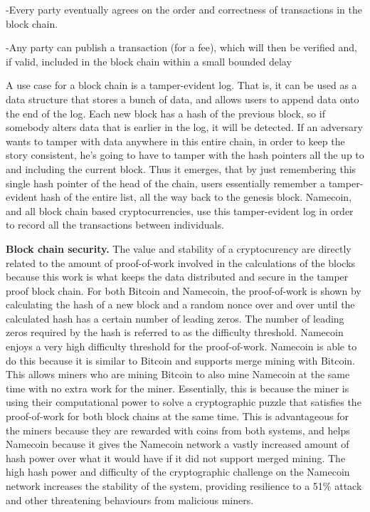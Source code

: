 -Every party eventually agrees on the order and correctness of transactions in the block chain.

-Any party can publish a transaction (for a fee), which will then be verified and, if valid, included in the block chain within a small bounded delay

A use case for a block chain is a tamper-evident log. That is, it can be used as a data structure that stores a bunch of data, and allows users to append data onto the end of the log. Each new block has a hash of the previous block, so if somebody alters data that is earlier in the log, it will be detected. If an adversary wants to tamper with data anywhere in this entire chain, in order to keep the story consistent, he's going to have to tamper with the hash pointers all the up to and including the current block. Thus it emerges, that by just remembering this single hash pointer of the head of the chain, users essentially remember a tamper-evident hash of the entire list, all the way back to the genesis block. Namecoin, and all block chain based cryptocurrencies, use this tamper-evident log in order to record all the transactions between individuals. 


{\bf Block chain security.}
The value and stability of a cryptocurency are directly related to the amount of proof-of-work involved in the calculations of the blocks because this work is what keeps the data distributed and secure in the tamper proof block chain. For both Bitcoin and Namecoin, the proof-of-work is shown by calculating the hash of a new block and a random nonce over and over until the calculated hash has a certain number of leading zeros. The number of leading zeros required by the hash is referred to as the difficulty threshold. Namecoin enjoys a very high difficulty threshold for the proof-of-work. Namecoin is able to do this because it is similar to Bitcoin and supports merge mining with Bitcoin. This allows miners who are mining Bitcoin to also mine Namecoin at the same time with no extra work for the miner. Essentially, this is because the miner is using their computational power to solve a cryptographic puzzle that satisfies the proof-of-work for both block chains at the same time. This is advantageous for the miners because they are rewarded with coins from both systems, and helps Namecoin because it gives the Namecoin network a vastly increased amount of hash power over what it would have if it did not support merged mining. The high hash power and difficulty of the cryptographic challenge on the Namecoin network increases the stability of the system, providing resilience to a 51\% attack and other threatening behaviours from malicious miners.

